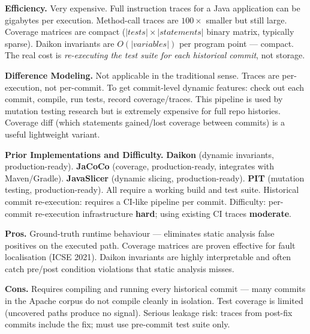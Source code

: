 \documentclass[12pt,a4paper]{article}
\begin{document}
\begin{effbox}
\textbf{Efficiency.}
Very expensive. Full instruction traces for a Java application can be gigabytes
per execution. Method-call traces are $100\times$ smaller but still large.
Coverage matrices are compact ($|tests| \times |statements|$ binary matrix,
typically sparse). Daikon invariants are $O(|variables|)$ per program point ---
compact. The real cost is \emph{re-executing the test suite for each historical
commit}, not storage.
\end{effbox}

\begin{diffbox}
\textbf{Difference Modeling.}
Not applicable in the traditional sense. Traces are per-execution, not
per-commit. To get commit-level dynamic features: check out each commit,
compile, run tests, record coverage/traces. This pipeline is used by mutation
testing research but is extremely expensive for full repo histories.
Coverage diff (which statements gained/lost coverage between commits) is a
useful lightweight variant.
\end{diffbox}

\begin{implbox}
\textbf{Prior Implementations and Difficulty.}
\textbf{Daikon} (dynamic invariants, production-ready).
\textbf{JaCoCo} (coverage, production-ready, integrates with Maven/Gradle).
\textbf{JavaSlicer} (dynamic slicing, production-ready).
\textbf{PIT} (mutation testing, production-ready).
All require a working build and test suite. Historical commit re-execution:
requires a CI-like pipeline per commit. Difficulty: per-commit re-execution
infrastructure \textbf{hard}; using existing CI traces \textbf{moderate}.
\end{implbox}

\begin{prosbox}
\textbf{Pros.}
Ground-truth runtime behaviour --- eliminates static analysis false positives
on the executed path. Coverage matrices are proven effective for fault
localisation (ICSE 2021). Daikon invariants are highly interpretable and
often catch pre/post condition violations that static analysis misses.
\end{prosbox}

\begin{consbox}
\textbf{Cons.}
Requires compiling and running every historical commit --- many commits in the
Apache corpus do not compile cleanly in isolation. Test coverage is limited
(uncovered paths produce no signal). Serious leakage risk: traces from
post-fix commits include the fix; must use pre-commit test suite only.
\end{consbox}
\end{document}
